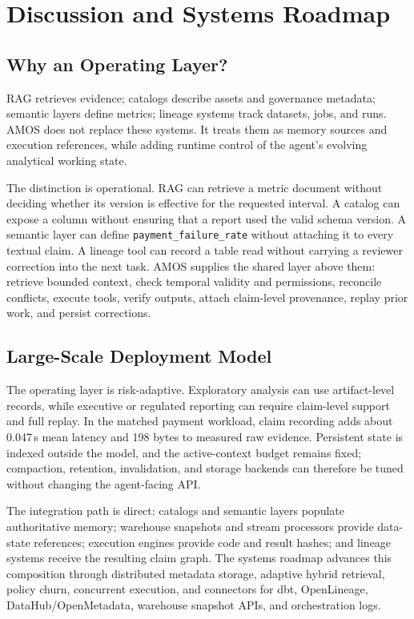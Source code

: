\documentclass[10pt]{article}
\newcommand{\amos}{\textsc{AMOS}\xspace}
\newcommand{\code}[1]{\texttt{#1}}
\begin{document}
\section{Discussion and Systems Roadmap}

\subsection{Why an Operating Layer?}
RAG retrieves evidence; catalogs describe assets and governance metadata; semantic layers define metrics; lineage systems track datasets, jobs, and runs. \amos does not replace these systems. It treats them as memory sources and execution references, while adding runtime control of the agent's evolving analytical working state.

The distinction is operational. RAG can retrieve a metric document without deciding whether its version is effective for the requested interval. A catalog can expose a column without ensuring that a report used the valid schema version. A semantic layer can define \code{payment\_failure\_rate} without attaching it to every textual claim. A lineage tool can record a table read without carrying a reviewer correction into the next task. \amos supplies the shared layer above them: retrieve bounded context, check temporal validity and permissions, reconcile conflicts, execute tools, verify outputs, attach claim-level provenance, replay prior work, and persist corrections.

\subsection{Large-Scale Deployment Model}
The operating layer is risk-adaptive. Exploratory analysis can use artifact-level records, while executive or regulated reporting can require claim-level support and full replay. In the matched payment workload, claim recording adds about 0.047\,s mean latency and 198 bytes to measured raw evidence. Persistent state is indexed outside the model, and the active-context budget remains fixed; compaction, retention, invalidation, and storage backends can therefore be tuned without changing the agent-facing API.

The integration path is direct: catalogs and semantic layers populate authoritative memory; warehouse snapshots and stream processors provide data-state references; execution engines provide code and result hashes; and lineage systems receive the resulting claim graph. The systems roadmap advances this composition through distributed metadata storage, adaptive hybrid retrieval, policy churn, concurrent execution, and connectors for dbt, OpenLineage, DataHub/OpenMetadata, warehouse snapshot APIs, and orchestration logs.
\end{document}

